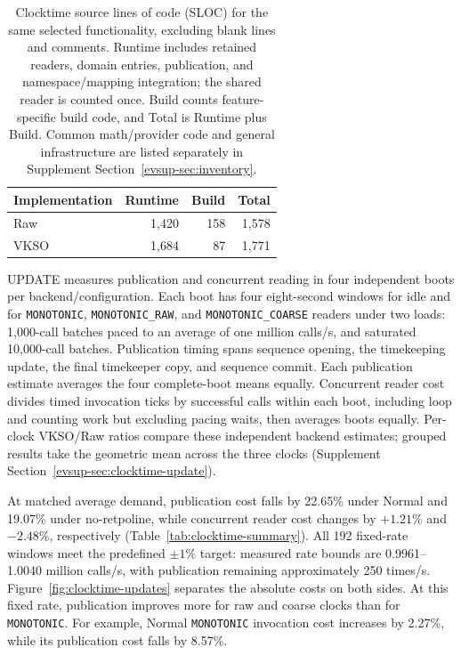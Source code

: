 \begin{table}[htbp]
\centering\small
\caption{Clocktime source lines of code (SLOC) for the same selected
functionality, excluding blank lines and comments. Runtime includes
retained readers, domain entries, publication, and namespace/mapping
integration; the shared reader is counted once. Build counts
feature-specific build code, and Total is Runtime plus Build. Common
math/provider code and general infrastructure are listed separately in
Supplement Section~\ref{evsup-sec:inventory}.}
\label{tab:clocktime-source-scope}
\begin{tabular*}{\columnwidth}{@{\extracolsep{\fill}}lrrr@{}}
\toprule
Implementation & Runtime & Build & Total \\
\midrule
Raw & 1,420 & 158 & 1,578 \\
VKSO & 1,684 & 87 & 1,771 \\
\bottomrule
\end{tabular*}
\end{table}

UPDATE measures publication and concurrent reading in four independent
boots per backend/configuration. Each boot has four eight-second windows
for idle and for \texttt{MONOTONIC}, \texttt{MONOTONIC\_RAW}, and
\texttt{MONOTONIC\_COARSE} readers under two loads: 1,000-call batches
paced to an average of one million calls/s, and saturated 10,000-call
batches. Publication timing spans sequence opening, the timekeeping
update, the final timekeeper copy, and sequence commit. Each publication
estimate averages the four complete-boot means equally. Concurrent reader
cost divides timed invocation ticks by successful calls within each boot,
including loop and counting work but excluding pacing waits, then averages
boots equally. Per-clock VKSO/Raw ratios compare these independent
backend estimates; grouped results take the geometric mean across the
three clocks (Supplement Section~\ref{evsup-sec:clocktime-update}).

At matched average demand, publication cost falls by 22.65\% under Normal
and 19.07\% under no-retpoline, while concurrent reader cost changes by
$+1.21\%$ and $-2.48\%$, respectively
(Table~\ref{tab:clocktime-summary}). All 192 fixed-rate windows meet the
predefined $\pm1\%$ target: measured rate bounds are 0.9961--1.0040
million calls/s, with publication remaining approximately 250 times/s.
Figure~\ref{fig:clocktime-updates} separates the absolute costs on both
sides. At this fixed rate, publication improves more for raw and coarse
clocks than for \texttt{MONOTONIC}. For example, Normal
\texttt{MONOTONIC} invocation
cost increases by 2.27\%, while its publication cost falls by 8.57\%.

